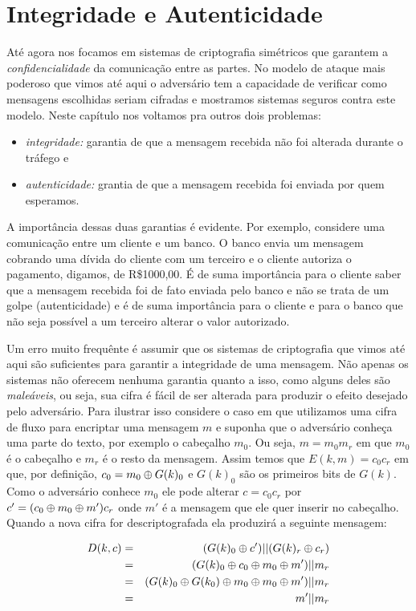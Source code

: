 \chapter{Integridade e Autenticidade}
\label{cha:mac}
Até agora nos focamos em sistemas de criptografia simétricos que garantem a {\em confidencialidade} da comunicação entre as partes.
No modelo de ataque mais poderoso que vimos até aqui o adversário tem a capacidade de verificar como mensagens escolhidas seriam cifradas e mostramos sistemas seguros contra este modelo.
Neste capítulo nos voltamos pra outros dois problemas:
\begin{itemize}
\item {\em integridade:} garantia de que a mensagem recebida não foi alterada durante o tráfego e
\item {\em autenticidade:} grantia de que a mensagem recebida foi enviada por quem esperamos.
\end{itemize}

A importância dessas duas garantias é evidente.
Por exemplo, considere uma comunicação entre um cliente e um banco.
O banco envia um mensagem cobrando uma dívida do cliente com um terceiro e o cliente autoriza o pagamento, digamos, de R\$1000,00.
É de suma importância para o cliente saber que a mensagem recebida foi de fato enviada pelo banco e não se trata de um golpe (autenticidade) e é de suma importância para o cliente e para o banco que não seja possível a um terceiro alterar o valor autorizado.

Um erro muito frequênte é assumir que os sistemas de criptografia que vimos até aqui são suficientes para garantir a integridade de uma mensagem.
Não apenas os sistemas não oferecem nenhuma garantia quanto a isso, como alguns deles são {\em maleáveis}, ou seja, sua cifra é fácil de ser alterada para produzir o efeito desejado pelo adversário.
Para ilustrar isso considere o caso em que utilizamos uma cifra de fluxo para encriptar uma mensagem $m$ e suponha que o adversário conheça uma parte do texto, por exemplo o cabeçalho $m_0$.
Ou seja, $m = m_0m_r$ em que $m_0$ é o cabeçalho e $m_r$ é o resto da mensagem.
Assim temos que $E(k, m) = c_0c_r$ em que, por definição, $c_0 = m_0 \oplus G(k)_0$ e $G(k)_0$ são os primeiros bits de $G(k)$.
Como o adversário conhece $m_0$ ele pode alterar $c = c_0c_r$ por $c' = (c_0 \oplus m_0 \oplus m')c_r$ onde $m'$ é a mensagem que ele quer inserir no cabeçalho.
Quando a nova cifra for descriptografada ela produzirá a seguinte mensagem:

\begin{eqnarray*}
  D(k,c) & = & (G(k)_0 \oplus c')||(G(k)_r \oplus c_r)\\
         & = & (G(k)_0 \oplus c_0 \oplus m_0 \oplus m')||m_r\\
         & = & (G(k)_0 \oplus G(k_0) \oplus m_0 \oplus m_0 \oplus m')||m_r\\
         & = & m'||m_r
\end{eqnarray*}

